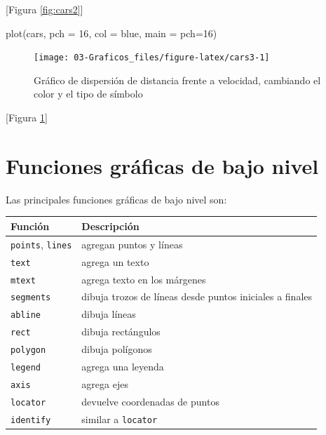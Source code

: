 \documentclass[
]{book}
\newenvironment{Shaded}{\begin{snugshade}}{\end{snugshade}}
\newcommand{\AttributeTok}[1]{\textcolor[rgb]{0.77,0.63,0.00}{#1}}
\newcommand{\DecValTok}[1]{\textcolor[rgb]{0.00,0.00,0.81}{#1}}
\newcommand{\FunctionTok}[1]{\textcolor[rgb]{0.00,0.00,0.00}{#1}}
\newcommand{\NormalTok}[1]{#1}
\newcommand{\StringTok}[1]{\textcolor[rgb]{0.31,0.60,0.02}{#1}}
\theoremstyle{break}
\theoremstyle{nonumberplain}
\begin{document}
{[}Figura \ref{fig:cars2}{]}

\begin{Shaded}
\begin{Highlighting}[]
\FunctionTok{plot}\NormalTok{(cars, }\AttributeTok{pch =} \DecValTok{16}\NormalTok{, }\AttributeTok{col =} \StringTok{\textquotesingle{}blue\textquotesingle{}}\NormalTok{, }\AttributeTok{main =} \StringTok{\textquotesingle{}pch=16\textquotesingle{}}\NormalTok{)}
\end{Highlighting}
\end{Shaded}

\begin{figure}[!htb]

{\centering \texttt{[image: 03-Graficos\_files/figure-latex/cars3-1]} 

}

\caption{Gráfico de dispersión de distancia frente a velocidad, cambiando el color y el tipo de símbolo}\label{fig:cars3}
\end{figure}

{[}Figura \ref{fig:cars3}{]}

\hypertarget{funciones-gruxe1ficas-de-bajo-nivel}{%
\section{Funciones gráficas de bajo nivel}\label{funciones-gruxe1ficas-de-bajo-nivel}}

Las principales funciones gráficas de bajo nivel son:

\begin{longtable}[]{@{}
  >{\raggedright\arraybackslash}p{}
  >{\raggedright\arraybackslash}p{}@{}}
\toprule
Función & Descripción \\
\midrule
\endhead
\texttt{points}, \texttt{lines} & agregan puntos y líneas \\
\texttt{text} & agrega un texto \\
\texttt{mtext} & agrega texto en los márgenes \\
\texttt{segments} & dibuja trozos de líneas desde puntos
iniciales a finales \\
\texttt{abline} & dibuja líneas \\
\texttt{rect} & dibuja rectángulos \\
\texttt{polygon} & dibuja polígonos \\
\texttt{legend} & agrega una leyenda \\
\texttt{axis} & agrega ejes \\
\texttt{locator} & devuelve coordenadas de puntos \\
\texttt{identify} & similar a \texttt{locator} \\
\bottomrule
\end{longtable}
\end{document}
